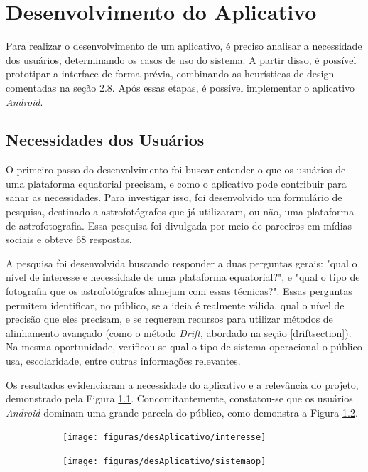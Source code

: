 \chapter{Desenvolvimento do Aplicativo}

Para realizar o desenvolvimento de um aplicativo, é preciso analisar a necessidade dos usuários, determinando os casos de uso do sistema. A partir disso, é possível prototipar a interface de forma prévia, combinando as heurísticas de design comentadas na seção 2.8. Após essas etapas, é possível implementar o aplicativo \textit{Android}.

\section{Necessidades dos Usuários}

O primeiro passo do desenvolvimento foi buscar entender o que os usuários de uma plataforma equatorial precisam, e como o aplicativo pode contribuir para sanar as necessidades. Para investigar isso, foi desenvolvido um formulário de pesquisa, destinado a astrofotógrafos que já utilizaram, ou não, uma plataforma de astrofotografia. Essa pesquisa foi divulgada por meio de parceiros em mídias sociais e obteve 68 respostas.

A pesquisa foi desenvolvida buscando responder a duas perguntas gerais: "qual o nível de interesse e necessidade de uma plataforma equatorial?", e "qual o tipo de fotografia que os astrofotógrafos almejam com essas técnicas?". Essas perguntas permitem identificar, no público, se a ideia é realmente válida, qual o nível de precisão que eles precisam, e se requerem recursos para utilizar métodos de alinhamento avançado (como o método \textit{Drift}, abordado na seção \ref{driftsection}). Na mesma oportunidade, verificou-se qual o tipo de sistema operacional o público usa, escolaridade, entre outras informações relevantes.
 
Os resultados evidenciaram a necessidade do aplicativo e a relevância do projeto, demonstrado pela Figura \ref{fig:resultadoapp}. Concomitantemente, constatou-se que os usuários \textit{Android} dominam uma grande parcela do público, como demonstra a Figura \ref{fig:usuariosandroid}. 


\begin{figure}[!htb]
	\centering
	\captionsetup[subfigure]{justification=centering}
	\caption{Resultados do Formulário de Pesquisa com Usuários. (a) Interesse dos astrofotógrafos no aplicativo. (b) Sistema operacional usado}
	\begin{subfigure}[b]{0.58\textwidth}
		\centering
		\texttt{[image: figuras/desAplicativo/interesse]}
		\caption{}
		\label{fig:resultadoapp}
	\end{subfigure}
	\hfill
	\begin{subfigure}[b]{0.41\textwidth}
		\centering
		\texttt{[image: figuras/desAplicativo/sistemaop]}
		\caption{}
		\label{fig:usuariosandroid}
	\end{subfigure}
	\label{fig:resultadosforms}
\end{figure}

